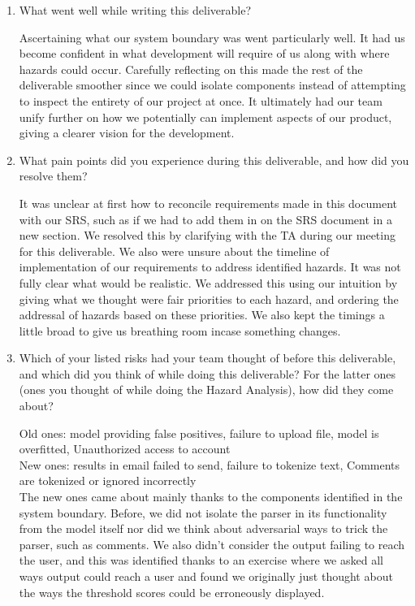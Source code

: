 \documentclass{article}
\begin{document}



\begin{enumerate}
    \item What went well while writing this deliverable? 

    Ascertaining what our system boundary was went particularly well. It had 
    us become confident in what development will require of us along with 
    where hazards could occur. Carefully reflecting on this made the rest 
    of the deliverable smoother since we could isolate components instead of 
    attempting to inspect the entirety of our project at once. It ultimately 
    had our team unify further on how we potentially can implement aspects of
    our product, giving a clearer vision for the development.

    \item What pain points did you experience during this deliverable, and how
    did you resolve them?

    It was unclear at first how to reconcile requirements made in this document
    with our SRS, such as if we had to add them in on the SRS document in a
    new section. We resolved this by clarifying with the TA during our meeting
    for this deliverable. We also were unsure about the timeline of
    implementation of our requirements to address identified hazards. It was
    not fully clear what would be realistic. We addressed this using our 
    intuition by giving what we thought were fair priorities to each
    hazard, and ordering the addressal of hazards based on these priorities.
    We also kept the timings a little broad to give us breathing room incase 
    something changes.

    \item Which of your listed risks had your team thought of before this
    deliverable, and which did you think of while doing this deliverable? For
    the latter ones (ones you thought of while doing the Hazard Analysis), how
    did they come about?
    
    Old ones: model providing false positives, failure to upload file, 
    model is overfitted, Unauthorized access to account
    \\
    New ones: results in email failed to send, failure to tokenize text, 
    Comments are tokenized or ignored incorrectly
    \\
    The new ones came about mainly thanks to the components identified in the 
    system boundary. Before, we did not isolate the parser in its functionality 
    from the model itself nor did we think about adversarial ways to trick the 
    parser, such as comments. We also didn't consider the output failing to 
    reach the user, and this was identified thanks to an exercise where we 
    asked all ways output could reach a user and found we originally just
    thought about the ways the threshold scores could be erroneously displayed.
    


\end{enumerate}
\end{document}
